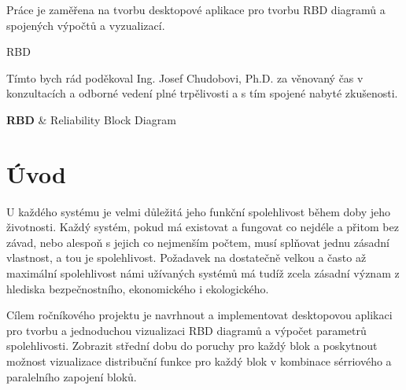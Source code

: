 \documentclass[FM,RP]{tulthesis}
\begin{document}
% 

\begin{abstractCZ}
    Práce je zaměřena na tvorbu desktopové aplikace pro tvorbu RBD diagramů a spojených výpočtů a vyzualizací.
\end{abstractCZ}

\begin{keywordsCZ}
    RBD
\end{keywordsCZ}

\vspace{2cm}



\clearpage

\begin{acknowledgement}
    Tímto bych rád poděkoval Ing. Josef Chudobovi, Ph.D. za věnovaný čas v konzultacích a odborné vedení plné trpělivosti a s tím spojené nabyté zkušenosti.
\end{acknowledgement}

\tableofcontents
\listoffigures

\clearpage

\begin{abbrList}
    \textbf{RBD} & Reliability Block Diagram \\
   
\end{abbrList}

\chapter*{Úvod}
    U každého systému je velmi důležitá jeho funkční spolehlivost během doby jeho životnosti. Každý systém, pokud má existovat a fungovat co nejdéle a přitom bez závad,
    nebo alespoň s jejich co nejmenším počtem, musí splňovat jednu zásadní vlastnost, a tou je spolehlivost. 
    Požadavek na dostatečně velkou a často až maximální spolehlivost námi užívaných systémů má tudíž zcela zásadní význam z hlediska bezpečnostního, ekonomického i
    ekologického. 

    Cílem ročníkového projektu je navrhnout a implementovat desktopovou aplikaci pro tvorbu a jednoduchou vizualizaci RBD diagramů a výpočet parametrů spolehlivosti.
    Zobrazit střední dobu do poruchy pro každý blok a poskytnout možnost vizualizace distribuční funkce pro každý blok v kombinace sérriového a paralelního zapojení bloků.
\end{document}
